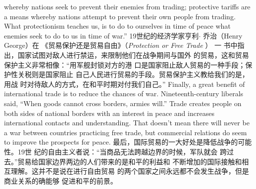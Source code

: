 \begin{paracol}{2}
whereby nations seek to prevent their enemies from trading;
protective tariffs are a means whereby nations attempt to prevent their own people from trading. What protectionism
teaches us, is to do to ourselves in time of peace what enemies
seek to do to us in time of war.''
\switchcolumn
19世纪的经济学家亨利$\cdot$ 乔治（Henry George）在 《贸易保护还是贸易自由》（\textit{Protection or Free Trade} ）  一 书中指
出，国家试图对敌人进行禁运，来限制他们在战争期间与国外
的贸易，这和贸易保护主义非常相像：“用军舰封锁对方的港
口是国家阻止敌人贸易的一种手段；保护性关税则是国家阻止
自己人民进行贸易的手段。贸易保护主义教给我们的是，用战
时对待敌人的方式，在和平时期对付我们自己。”
\switchcolumn*
Finally, a great benefit of international trade is to reduce the
chances of war. Nineteenth-century liberals said, ``When goods
cannot cross borders, armies will.'' Trade creates people on both
sides of national borders with an interest in peace and increases
international contacts and understanding. That doesn't mean
there will never be a war between countries practicing free
trade, but commercial relations do seem to improve the
prospects for peace.
\switchcolumn
最后，国际贸易的一大好处是降低战争的可能性。19世
纪的自由主义者说：“当商品无法跨越边界的时候，军队就会
跨过去。”贸易给国家边界两边的人们带来的是和平的利益和
不断增加的国际接触和相互理解。这并不是说在进行自由贸易
的两个国家之间永远都不会发生战争，但是商业关系的确能够
促进和平的前景。


\end{paracol}
